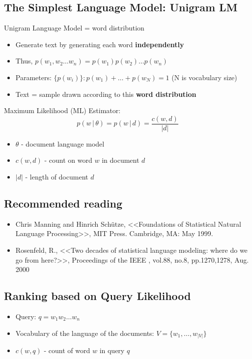 \subsection{The Simplest Language Model: Unigram LM}
Unigram Language Model = word distribution
\begin{itemize}
\item Generate text by generating each word \textbf{independently} 
\item Thus, $p(w_1, w_2 \dots w_n) = p(w_1)p(w_2) \dots p(w_n)$
\item Parameters: $\{p(w_i)\}: p(w_1) + \ldots + p(w_N) = 1$ (N is vocabulary size)
\item Text = sample drawn according to this \textbf{word distribution}
\end{itemize}

Maximum Likelihood (ML) Estimator:
\begin{equation*}
p(w \,\big|\, \theta) = p(w \,\big|\, d) = \frac{c(w, d)}{|d|}
\end{equation*}
\begin{itemize}
\item $\theta$ - document language model
\item $c(w, d)$ - count on word $w$ in document $d$
\item $|d|$ - length of document $d$
\end{itemize}

\subsection{Recommended reading}
\begin{itemize}
\item Chris Manning and Hinrich Sch{\"u}tze, <<Foundations of Statistical Natural Language Processing>>, MIT Press. Cambridge, MA: May 1999.
\item  Rosenfeld, R., <<Two decades of statistical language modeling: where do we go from here?>>, Proceedings of the IEEE , vol.88, no.8, pp.1270,1278, Aug. 2000
\end{itemize}

\subsection{Ranking based on Query Likelihood}

\begin{itemize}
\item Query: $q = w_1 w_2 \dots w_n$
\item Vocabulary of the language of the documents: $V = \{ w_1, \dots ,w_{|V|} \}$
\item $c(w, q)$ - count of word $w$ in query $q$
\end{itemize}

